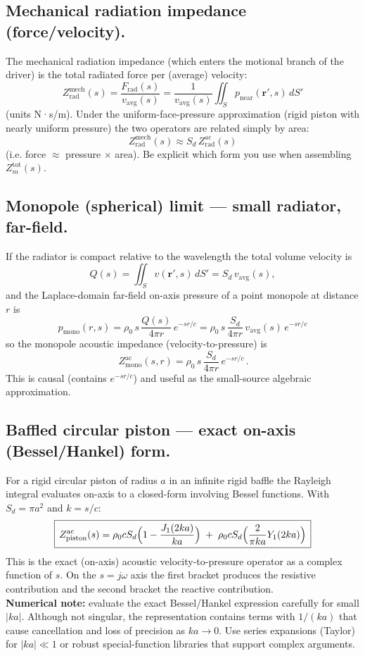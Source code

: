 \subsection{Mechanical radiation impedance (force/velocity).}
The mechanical radiation impedance (which enters the motional branch of the driver) is the total radiated force per (average) velocity:
\[
\boxed{\,Z_{\mathrm{rad}}^{\mathrm{mech}}(s)=\frac{F_{\mathrm{rad}}(s)}{v_{\mathrm{avg}}(s)}
=\frac{1}{v_{\mathrm{avg}}(s)}\iint_S p_{\mathrm{near}}(\mathbf{r}',s)\,dS'\,}
\]
(units N·s/m). Under the uniform-face-pressure approximation (rigid piston with nearly uniform pressure) the two operators are related simply by area:
\[
\boxed{\,Z_{\mathrm{rad}}^{\mathrm{mech}}(s)\approx S_d\,Z_{\mathrm{rad}}^{\mathrm{ac}}(s)\,}
\]
(i.e. force \(\approx\) pressure \(\times\) area). Be explicit which form you use when assembling \(Z_m^{\mathrm{tot}}(s)\).

\subsection{Monopole (spherical) limit — small radiator, far-field.}
If the radiator is compact relative to the wavelength the total volume velocity is
\[
Q(s)=\iint_S v(\mathbf{r}',s)\,dS' = S_d\,v_{\mathrm{avg}}(s),
\]
and the Laplace-domain far-field on-axis pressure of a point monopole at distance \(r\) is
\[
\boxed{\,p_{\mathrm{mono}}(r,s)=\rho_0\,s\,\frac{Q(s)}{4\pi r}\,e^{-s r/c}
=\rho_0\,s\,\frac{S_d}{4\pi r}\,v_{\mathrm{avg}}(s)\,e^{-s r/c}\,}
\]
so the monopole acoustic impedance (velocity-to-pressure) is
\[
\boxed{\,Z_{\mathrm{mono}}^{\mathrm{ac}}(s,r)=\rho_0\,s\,\frac{S_d}{4\pi r}\,e^{-s r/c}\,.}
\]
This is causal (contains \(e^{-s r/c}\)) and useful as the small-source algebraic approximation.

\subsection{Baffled circular piston — exact on-axis (Bessel/Hankel) form.}
For a rigid circular piston of radius \(a\) in an infinite rigid baffle the Rayleigh integral evaluates on-axis to a closed-form involving Bessel functions. With \(S_d=\pi a^2\) and \(k=s/c\):
\[
\boxed{\,Z_{\mathrm{piston}}^{\mathrm{ac}}(s)
= \rho_0 c S_d\Bigl(1 - \frac{J_1(2ka)}{ka}\Bigr)
\;+\; \rho_0 c S_d\Bigl(\frac{2}{\pi k a}Y_1(2ka)\Bigr)\,}
\]
This is the exact (on-axis) acoustic velocity-to-pressure operator as a complex function of \(s\). On the \(s=j\omega\) axis the first bracket produces the resistive contribution and the second bracket the reactive contribution.\\
\textbf{Numerical note:} evaluate the exact Bessel/Hankel expression carefully for small \(|ka|\). Although not singular, the representation contains terms with \(1/(ka)\) that cause cancellation and loss of precision as \(ka\to 0\). Use series expansions (Taylor) for \(|ka|\ll1\) or robust special-function libraries that support complex arguments.

